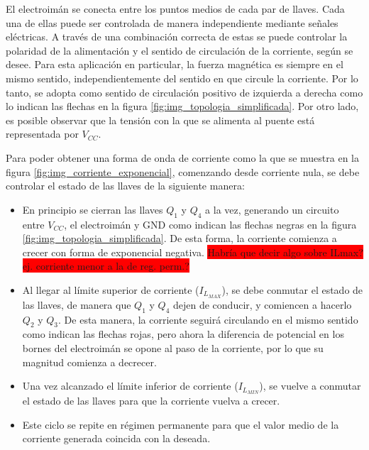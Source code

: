 El electroimán se conecta entre los puntos medios de cada par de llaves. Cada una de ellas puede ser controlada de manera independiente mediante señales eléctricas. A través de una combinación correcta de estas se puede controlar la polaridad de la alimentación y el sentido de circulación de la corriente, según se desee. Para esta aplicación en particular, la fuerza magnética es siempre en el mismo sentido, independientemente del sentido en que circule la corriente. Por lo tanto, se adopta como sentido de circulación positivo de izquierda a derecha como lo indican las flechas en la figura \ref{fig:img_topologia_simplificada}. Por otro lado, es posible observar que la tensión con la que se alimenta al puente está representada por $V_{CC}$.

Para poder obtener una forma de onda de corriente como la que se muestra en la figura \ref{fig:img_corriente_exponencial}, comenzando desde corriente nula, se debe controlar el estado de las llaves de la siguiente manera:

\begin{itemize}
	\item En principio se cierran las llaves $Q_1$ y $Q_4$ a la vez, generando un circuito entre $V_{CC}$, el electroimán y GND como indican las flechas negras en la figura \ref{fig:img_topologia_simplificada}. De esta forma, la corriente comienza a crecer con forma de exponencial negativa. 
	\colorbox{red}{Habría que decir algo sobre ILmax? ej. corriente menor a la de reg. perm.?}
	\item Al llegar al límite superior de corriente ($I_{L_{MAX}}$), se debe conmutar el estado de las llaves, de manera que $Q_1$ y $Q_4$ dejen de conducir, y comiencen a hacerlo $Q_2$ y $Q_3$. De esta manera, la corriente seguirá circulando en el mismo sentido como indican las flechas rojas, pero ahora la diferencia de potencial en los bornes del electroimán se opone al paso de la corriente, por lo que su magnitud comienza a decrecer.
	\item Una vez alcanzado el límite inferior de corriente ($I_{L_{MIN}}$), se vuelve a conmutar el estado de las llaves para que la corriente vuelva a crecer.
	\item Este ciclo se repite en régimen permanente para que el valor medio de la corriente generada coincida con la deseada. 
\end{itemize}


